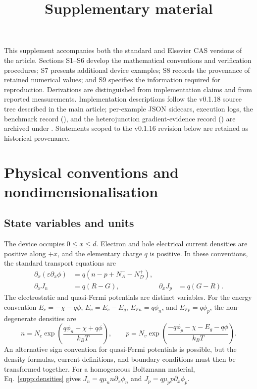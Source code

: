 \documentclass[11pt,a4paper]{article}
\title{\large Supplementary material\\[6pt]\Large\papertitle}
\author{\paperauthors}
\date{}
\numberwithin{equation}{section}
\begin{document}
\maketitle
\paperaffiliations

\noindent This supplement accompanies both the standard and Elsevier CAS
versions of the article. Sections S1--S6 develop the mathematical
conventions and verification procedures; S7 presents additional device
examples; S8 records the provenance of retained numerical values; and S9
specifies the information required for reproduction. Derivations are
distinguished from implementation claims and from reported measurements.
Implementation descriptions follow the v0.1.18 source tree described in
the main article; per-example JSON sidecars, execution logs, the
benchmark record (), and the heterojunction
gradient-evidence record () are
archived under . Statements scoped to the
v0.1.16 revision below are retained as historical provenance.

\section{Physical conventions and nondimensionalisation}\label{supp:physics}
\subsection{State variables and units}
The device occupies $0\leq x\leq d$. Electron and hole electrical current
densities are positive along $+x$, and the elementary charge $q$ is
positive. In these conventions, the standard transport equations
are~\cite{gaury2019,mann2022partial}
\begin{align}
\partial_x(\varepsilon\partial_x\phi)
 &=q(n-p+N_A^- -N_D^+),\\
\partial_xJ_n&=q(R-G),&\partial_xJ_p&=q(G-R).
\end{align}
The electrostatic and quasi-Fermi potentials are distinct variables.
For the energy convention $E_c=-\chi-q\phi$,
$E_v=E_c-E_g$, $E_{Fn}=q\phi_n$, and $E_{Fp}=q\phi_p$,
the non-degenerate densities are~\cite{gaury2019,mann2022partial}
\begin{equation}
n=N_c\exp\!\left(\frac{q\phi_n+\chi+q\phi}{k_BT}\right),\qquad
p=N_v\exp\!\left(\frac{-q\phi_p-\chi-E_g-q\phi}{k_BT}\right).
\label{supp:densities}
\end{equation}
An alternative sign convention for quasi-Fermi potentials is possible,
but the density formulas, current definitions, and boundary conditions
must then be transformed together. For a homogeneous Boltzmann material,
Eq.~\eqref{supp:densities} gives $J_n=q\mu_n n\partial_x\phi_n$ and
$J_p=q\mu_p p\partial_x\phi_p$.
\end{document}
